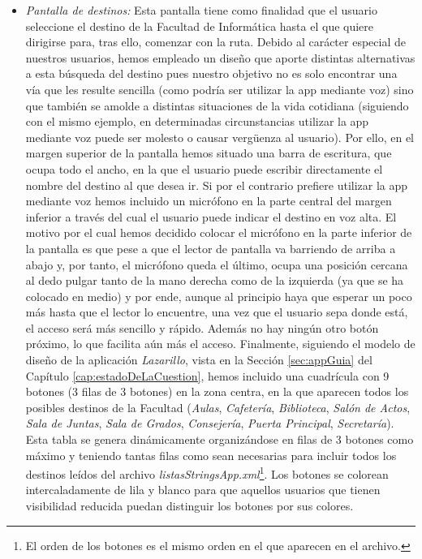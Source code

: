 \begin{itemize}
	\item \textit{Pantalla de destinos:} Esta pantalla tiene como finalidad que el usuario seleccione el destino de la Facultad de Informática hasta el que quiere dirigirse para, tras ello, comenzar con la ruta. Debido al carácter especial de nuestros usuarios, hemos empleado un diseño que aporte distintas alternativas a esta búsqueda del destino pues nuestro objetivo no es solo encontrar una vía que les resulte sencilla (como podría ser utilizar la app mediante voz) sino que también se amolde a distintas situaciones de la vida cotidiana (siguiendo con el mismo ejemplo, en determinadas circunstancias utilizar la app mediante voz puede ser molesto o causar vergüenza al usuario). Por ello, en el margen superior de la pantalla hemos situado una barra de escritura, que ocupa todo el ancho, en la que el usuario puede escribir directamente el nombre del destino al que desea ir. Si por el contrario prefiere utilizar la app mediante voz hemos incluido un micrófono en la parte central del margen inferior a través del cual el usuario puede indicar el destino en voz alta. El motivo por el cual hemos decidido colocar el micrófono en la parte inferior de la pantalla es que pese a que el lector de pantalla va barriendo de arriba a abajo y, por tanto, el micrófono queda el último, ocupa una posición cercana al dedo pulgar tanto de la mano derecha como de la izquierda (ya que se ha colocado en medio) y por ende, aunque al principio haya que esperar un poco más hasta que el lector lo encuentre, una vez que el usuario sepa donde está, el acceso será más sencillo y rápido. Además no hay ningún otro botón próximo, lo que facilita aún más el acceso. Finalmente, siguiendo el modelo de diseño de la aplicación \textit{Lazarillo}, vista en la Sección \ref{sec:appGuia} del Capítulo \ref{cap:estadoDeLaCuestion}, hemos incluido una cuadrícula con 9 botones (3 filas de 3 botones) en la zona centra, en la que aparecen todos los posibles destinos de la Facultad (\textit{Aulas}, \textit{Cafetería}, \textit{Biblioteca}, \textit{Salón de Actos}, \textit{Sala de Juntas}, \textit{Sala de Grados}, \textit{Consejería},\textit{ Puerta Principal}, \textit{Secretaría}). Esta tabla se genera dinámicamente organizándose en filas de 3 botones como máximo y teniendo tantas filas como sean necesarias para incluir todos los destinos leídos del archivo \textit{listasStringsApp.xml}\footnote{El orden de los botones es el mismo orden en el que aparecen en el archivo.}. Los botones se colorean intercaladamente de lila y blanco para que aquellos usuarios que tienen visibilidad reducida puedan distinguir los botones por sus colores. 
	

\end{itemize}
